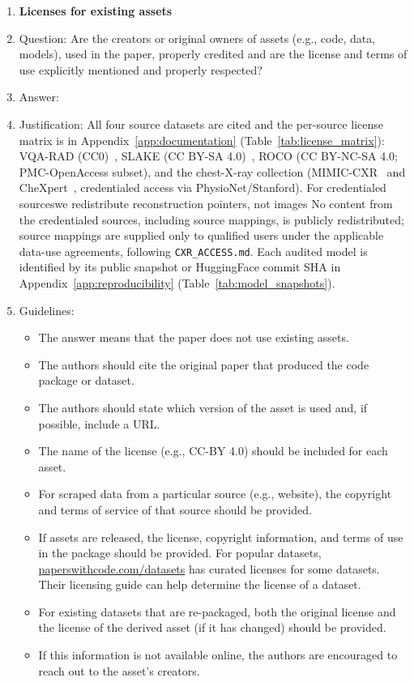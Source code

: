 \documentclass{article}
\providecommand{\DIFaddtex}[1]{{\protect\color{blue} \sf #1}} %
\providecommand{\DIFdeltex}[1]{{\protect\color{red} \scriptsize #1}} %
\providecommand{\DIFaddbegin}{} %
\providecommand{\DIFaddend}{} %
\providecommand{\DIFdelbegin}{} %
\providecommand{\DIFdelend}{} %
\providecommand{\DIFadd}[1]{\texorpdfstring{\DIFaddtex{#1}}{#1}} %
\providecommand{\DIFdel}[1]{\texorpdfstring{\DIFdeltex{#1}}{}} %
\begin{document}
\begin{enumerate}
\item {\bf Licenses for existing assets}
    \item[] Question: Are the creators or original owners of assets (e.g., code, data, models), used in the paper, properly credited and are the license and terms of use explicitly mentioned and properly respected?
    \item[] Answer: \answerYes{}
    \item[] Justification: All four source datasets are cited and the per-source license matrix is in Appendix~\ref{app:documentation} (Table~\ref{tab:license_matrix}): VQA-RAD (CC0)~\cite{lau2018vqarad}, SLAKE (CC BY-SA 4.0)~\cite{liu2021slake}, ROCO (CC BY-NC-SA 4.0; PMC-OpenAccess subset), and the chest-X-ray collection (MIMIC-CXR~\cite{johnson2019mimiccxr} and CheXpert~\cite{irvin2019chexpert}, credentialed access via PhysioNet/Stanford). \DIFdelbegin \DIFdel{For credentialed sourceswe redistribute reconstruction pointers, not images}\DIFdelend \DIFaddbegin \DIFadd{No content from the credentialed sources, including source mappings, is publicly redistributed; source mappings are supplied only to qualified users under the applicable data-use agreements, following \texttt{CXR\_ACCESS.md}}\DIFaddend . Each audited model is identified by its public snapshot or HuggingFace commit SHA in Appendix~\ref{app:reproducibility} (Table~\ref{tab:model_snapshots}).
    \item[] Guidelines:
    \begin{itemize}
        \item The answer \answerNA{} means that the paper does not use existing assets.
        \item The authors should cite the original paper that produced the code package or dataset.
        \item The authors should state which version of the asset is used and, if possible, include a URL.
        \item The name of the license (e.g., CC-BY 4.0) should be included for each asset.
        \item For scraped data from a particular source (e.g., website), the copyright and terms of service of that source should be provided.
        \item If assets are released, the license, copyright information, and terms of use in the package should be provided. For popular datasets, \url{paperswithcode.com/datasets} has curated licenses for some datasets. Their licensing guide can help determine the license of a dataset.
        \item For existing datasets that are re-packaged, both the original license and the license of the derived asset (if it has changed) should be provided.
        \item If this information is not available online, the authors are encouraged to reach out to the asset's creators.
    \end{itemize}


\end{enumerate}
\end{document}
